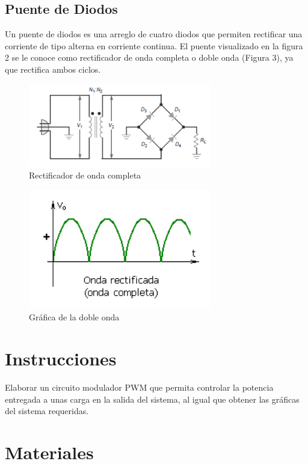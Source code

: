 \documentclass[]{article}
\begin{document}
\subsection{Puente de Diodos}

Un puente de diodos es una arreglo de cuatro diodos que permiten rectificar una corriente de tipo alterna en corriente continua. El puente visualizado en la figura 2 se le conoce como
rectificador de onda completa o doble onda (Figura 3), ya que rectifica ambos ciclos.

\begin{figure}
    \centering
    \includegraphics[width=8cm]{build/Imagenes/Rectificador.png}
    \caption{Rectificador de onda completa}
\end{figure}

\begin{figure}
    \centering
    \includegraphics[width=8cm]{build/Imagenes/OndaComp.png}
        \caption{Gráfica de la doble onda}
\end{figure}

\section{Instrucciones}

Elaborar un circuito modulador PWM que permita controlar la potencia entregada a unas carga en la salida del sistema, al igual que obtener las gráficas del sistema requeridas.

\section{Materiales}
\end{document}
